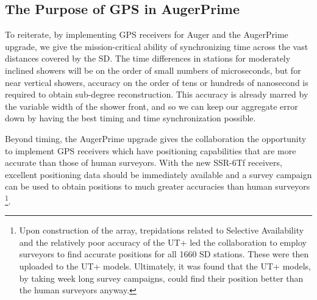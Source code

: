 \subsection{The Purpose of GPS in AugerPrime}
To reiterate, by implementing GPS receivers for Auger and the AugerPrime upgrade, we give the mission-critical ability of synchronizing time across the vast distances covered by the SD. The time differences in stations for moderately inclined showers will be on the order of small numbers of microseconds, but for near vertical showers, accuracy on the order of tens or hundreds of nanosecond is required to obtain sub-degree reconstruction. This accuracy is already marred by the variable width of the shower front, and so we can keep our aggregate error down by having the best timing and time synchronization possible. 

Beyond timing, the AugerPrime upgrade gives the collaboration the opportunity to implement GPS receivers which have positioning capabilities that are more accurate than those of human surveyors. With the new SSR-6Tf receivers, excellent positioning data should be immediately available and a survey campaign can be used to obtain positions to much greater accuracies than human surveyors \footnote{Upon construction of the array, trepidations related to Selective Availability and the relatively poor accuracy of the UT+ led the collaboration to employ surveyors to find accurate positions for all 1660 SD stations. These were then uploaded to the UT+ models. Ultimately, it was found that the UT+ models, by taking week long survey campaigns, could find their position better than the human surveyors anyway.}. 

